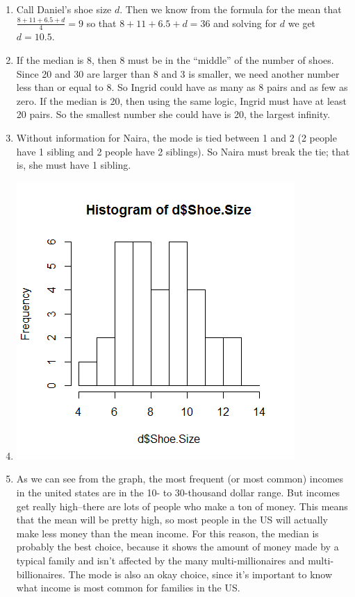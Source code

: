 \documentclass[12pt]{article}
\begin{document}
\begin{enumerate}
	\item Call Daniel's shoe size $d$. Then we know from the formula for the mean that $\frac{8 + 11 + 6.5 + d}{4} = 9$ so that $8 + 11 + 6.5 + d = 36$ and solving for $d$ we get $d = 10.5$.
	\item If the median is 8, then 8 must be in the ``middle'' of the number of shoes. Since 20 and 30 are larger than 8 and 3 is smaller, we need another number less than or equal to 8. So Ingrid could have as many as 8 pairs and as few as zero. If the median is 20, then using the same logic, Ingrid must have at least 20 pairs. So the smallest number she could have is 20, the largest infinity.
	\item Without information for Naira, the mode is tied between 1 and 2 (2 people have 1 sibling and 2 people have 2 siblings). So Naira must break the tie; that is, she must have 1 sibling.
	\item \includegraphics{hw4hist}
	\item As we can see from the graph, the most frequent (or most common) incomes in the united states are in the 10- to 30-thousand dollar range. But incomes get really high--there are lots of people who make a ton of money. This means that the mean will be pretty high, so most people in the US will actually make less money than the mean income. For this reason, the median is probably the best choice, because it shows the amount of money made by a typical family and isn't affected by the many multi-millionaires and multi-billionaires. The mode is also an okay choice, since it's important to know what income is most common for families in the US.
\end{enumerate}
\end{document}
